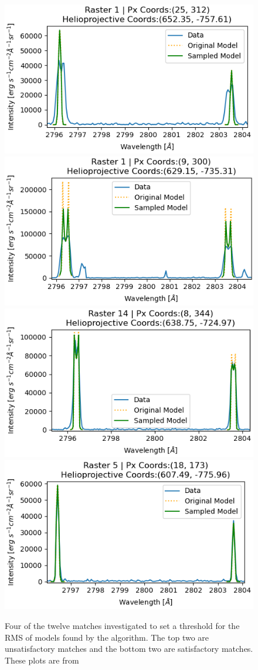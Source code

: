 \begin{figure}
    \centering
    \resizebox{\hsize}{!}
    {\includegraphics[width=0.49\linewidth]{./02Modelling1D/figs/20180419/inv/bad5.png}
    \includegraphics[width=0.49\linewidth]{./02Modelling1D/figs/20180419/inv/bad1.png}
    }
    \resizebox{\hsize}{!}
    {\includegraphics[width=0.49\linewidth]{./02Modelling1D/figs/20180419/inv/good7.png}
    \includegraphics[width=0.49\linewidth]{./02Modelling1D/figs/20180419/inv/good3.png}
    }
    \caption[Four of the twelve matches investigated to set a threshold for the RMS of models found by the algorithm.]{Four of the twelve matches investigated to set a threshold for the RMS of models found by the algorithm. The top two are unsatisfactory matches and the bottom two are satisfactory matches. These plots are from \cite{peat_solar_2021}}
    \label{egpx}
\end{figure}


